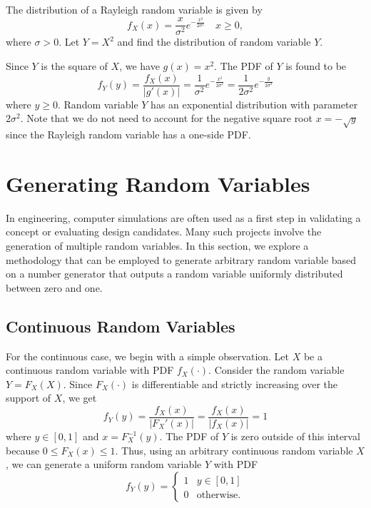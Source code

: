 \begin{example}
The distribution of a Rayleigh random variable is given by
\begin{equation*}
f_X (x) = \frac{x}{\sigma^2} e^{- \frac{x^2}{2 \sigma^2} } \quad x \geq 0,
\end{equation*}
where $\sigma > 0$.
Let $Y = X^2$ and find the distribution of random variable $Y$.

Since $Y$ is the square of $X$, we have $g(x) = x^2$.
The PDF of $Y$ is found to be
\begin{equation*}
f_Y(y) = \frac{f_X (x)}{|g'(x)|}
= \frac{1}{\sigma^2} e^{- \frac{x^2}{2 \sigma^2} }
= \frac{1}{2 \sigma^2} e^{- \frac{y}{2 \sigma^2} }
\end{equation*}
where $y \geq 0$.
Random variable $Y$ has an exponential distribution with parameter $2 \sigma^2$.
Note that we do not need to account for the negative square root $x = - \sqrt{y}$ since the Rayleigh random variable has a one-side PDF.
\end{example}


\section{Generating Random Variables}

In engineering, computer simulations are often used as a first step in validating a concept or evaluating design candidates.
Many such projects involve the generation of multiple random variables.
In this section, we explore a methodology that can be employed to generate arbitrary random variable based on a number generator that outputs a random variable uniformly distributed between zero and one.

\subsection{Continuous Random Variables}

For the continuous case, we begin with a simple observation.
Let $X$ be a continuous random variable with PDF $f_X (\cdot)$.
Consider the random variable $Y = F_X(X)$.
Since $F_X (\cdot)$ is differentiable and strictly increasing over the support of $X$, we get
\begin{equation*}
f_Y (y) = \frac{f_X (x)}{| F_X'(x) |}
= \frac{f_X (x)}{| f_X (x) |} = 1
\end{equation*}
where $y \in [0, 1]$ and $x = F_X^{-1} (y)$.
The PDF of $Y$ is zero outside of this interval because $0 \leq F_X (x) \leq 1$.
Thus, using an arbitrary continuous random variable $X$, we can generate a uniform random variable $Y$ with PDF
\begin{equation*}
f_Y(y) = \begin{cases} 1 & y \in [0,1] \\
0 & \text{otherwise} . \end{cases}
\end{equation*}

